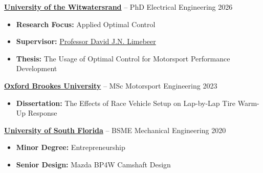 \documentclass[12pt,letterpaper]{article} %
\begin{document}
\textbf{\href{https://www.wits.ac.za/eie/}{University of the Witwatersrand}} -- PhD Electrical Engineering \hfill 2026 \\
\vspace{-9pt}
\begin{itemize}[itemsep=-4pt]
    \item \textbf{Research Focus:} Applied Optimal Control
    \item \textbf{Supervisor:} \href{https://www.nrf.ac.za/about-us/nrf-awards/2022-2/a-rated-researchers-2022/professor-david-j-n-limebeer/}{Professor David J.N. Limebeer}
    \item \textbf{Thesis:} The Usage of Optimal Control for Motorsport Performance Development
\end{itemize}

\vspace{-5pt}
\textbf{\href{https://www.brookes.ac.uk/courses/postgraduate/motorsport-engineering-msc}{Oxford Brookes University}} -- MSc Motorsport Engineering \hfill 2023 \\
\vspace{-9pt}
\begin{itemize}[itemsep =-4pt]
    \item \textbf{Dissertation:} The Effects of Race Vehicle Setup on Lap-by-Lap Tire Warm-Up Response
\end{itemize}

\vspace{-5pt}
\textbf{\href{https://www.usf.edu/engineering/me/}{University of South Florida}} -- BSME Mechanical Engineering \hfill 2020 \\
\vspace{-9pt}
\begin{itemize}[itemsep = -4pt]
    \item \textbf{Minor Degree:} Entrepreneurship
    \item \textbf{Senior Design:} Mazda BP4W Camshaft Design
\end{itemize}

\vspace{-18.5pt} %

\end{document}
